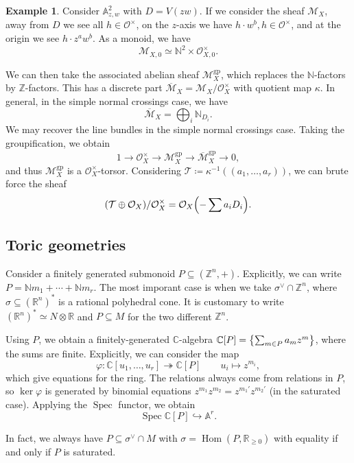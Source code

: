 \documentclass[leqno, openany]{memoir}
\theoremstyle{definition}
\newtheorem{exm}[thm]{Example}
\theoremstyle{remark}
\theoremstyle{plain}
\theoremstyle{definition}
\theoremstyle{remark}
\newcommand{\A}{\mathbb{A}}
\newcommand{\N}{\mathbb{N}}
\newcommand{\R}{\mathbb{R}}
\newcommand{\C}{\mathbb{C}}
\newcommand{\Z}{\mathbb{Z}}
\newcommand{\mc}[1]{\mathcal{#1}}
\newcommand{\mr}[1]{\mathrm{#1}}
\newcommand{\ol}[1]{\overline{#1}}
\DeclareMathOperator{\Hom}{Hom}
\DeclareMathOperator{\Spec}{Spec}
\begin{document}
\begin{exm}
    Consider $\A^2_{z,w}$ with $D = V(zw)$. If we consider the sheaf $\mc{M}_X$, away from $D$ we see all $h \in \mc{O}^{\times}$, on the $z$-axis we have $h \cdot w^b, h \in \mc{O}^{\times}$, and at the origin we see $h \cdot z^a w^b$. As a monoid, we have
    \[ \mc{M}_{X,0} \simeq \N^2 \times \mc{O}_{X,0}^{\times}. \]
\end{exm}

We can then take the associated abelian sheaf $\mc{M}_X^{\mr{gp}}$, which replaces the $\N$-factors by $\Z$-factors. This has a discrete part $\ol{\mc{M}}_X = \mc{M}_X/\mc{O}_X^{\times}$ with quotient map $\kappa$. In general, in the simple normal crossings case, we have
\[ \ol{\mc{M}}_X = \bigoplus_i \N_{D_i}. \]
We may recover the line bundles in the simple normal crossings case. Taking the groupification, we obtain
\[ 1 \to \mc{O}_X^{\times} \to \mc{M}_X^{\mr{gp}} \to \ol{\mc{M}}_X^{\mr{gp}} \to 0, \]
and thus $\mc{M}_X^{\mr{gp}}$ is a $\mc{O}_X^{\times}$-torsor. Considering $\mc{T} \coloneqq \kappa^{-1}((a_1, \ldots, a_r))$, we can brute force the sheaf
\[ (\mc{T} \oplus \mc{O}_X) / \mc{O}_X^{\times} = \mc{O}_X\qty(-\sum a_i D_i). \]

\subsection{Toric geometries}

Consider a finitely generated submonoid $P \subseteq (\Z^n, +)$. Explicitly, we can write $P = \N m_1 + \cdots + \N m_r$. The most imporant case is when we take $\sigma^{\vee} \cap \Z^n$, where $\sigma \subseteq (\R^n)^*$ is a rational polyhedral cone. It is customary to write $(\R^n)^* \simeq N \otimes \R$ and $P \subseteq M$ for the two different $\Z^n$.

Using $P$, we obtain a finitely-generated $\C$-algebra $\C[P] = \qty{\sum_{m \in P} a_m z^m}$, where the sums are finite. Explicitly, we can consider the map
\[ \varphi \colon \C[u_1, \ldots, u_r] \twoheadrightarrow \C[P] \qquad u_i \mapsto z^{m_i}, \]
which give equations for the ring. The relations always come from relations in $P$, so $\ker \varphi$ is generated by binomial equations $z^{m_1} z^{m_2} = z^{m_1'} z^{m_2'}$ (in the saturated case). Applying the $\Spec$ functor, we obtain
\[ \Spec \C[P] \hookrightarrow \A^r. \]

In fact, we always have $P \subseteq \sigma^{\vee} \cap M$ with $\sigma = \Hom(P, \R_{\geq 0})$ with equality if and only if $P$ is saturated.
\end{document}
